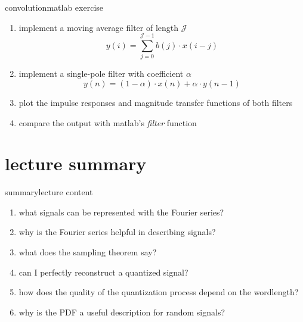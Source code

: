         \begin{frame}{convolution}{matlab exercise}
            
            \begin{enumerate}
                \item   implement a moving average filter of length $\mathcal{J}$
                		\begin{equation*}
                            y(i) = \sum\limits_{j=0}^{\mathcal{J}-1}{b(j)\cdot x(i-j)}
                        \end{equation*} 

                \item   implement a single-pole filter with coefficient $\alpha$
                        \begin{equation*}
                            y(n) = (1-\alpha)\cdot x(n) + \alpha\cdot y(n-1)
                        \end{equation*}
                \item   plot the impulse responses and magnitude transfer functions of both filters
                \item   compare the output with matlab's \textsl{filter} function
            \end{enumerate}
        \end{frame}
        
    \section[summary]{lecture summary}
        \begin{frame}{summary}{lecture content}
            \begin{enumerate}
                \item       what signals can be represented with the Fourier series?
                \bigskip
                \item<2->   why is the Fourier series helpful in describing signals?
                \bigskip
                \item<3->   what does the sampling theorem say?
                \bigskip
                \item<4->   can I perfectly reconstruct a quantized signal?
                \bigskip
                \item<5->   how does the quality of the quantization process depend on the wordlength?
                \bigskip
                \item<6->   why is the PDF a useful description for random signals?
            \end{enumerate}
        \end{frame}



